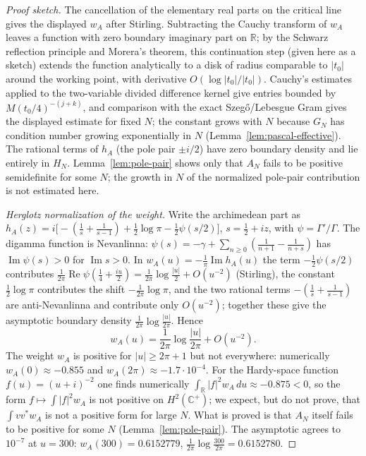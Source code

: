 \documentclass[11pt]{amsart}
\theoremstyle{definition}
\theoremstyle{remark}
\theoremstyle{definition}
\renewcommand{\Re}{\operatorname{Re}}
\renewcommand{\Im}{\operatorname{Im}}
\newcommand{\half}{\tfrac{1}{2}}
\newcommand{\R}{\mathbb{R}}
\newcommand{\C}{\mathbb{C}}
\begin{document}
\begin{proof}[Proof sketch]
The cancellation of the elementary real parts on the critical line gives the displayed $w_A$ after
Stirling.  Subtracting the Cauchy transform of $w_A$ leaves a function with zero boundary imaginary
part on $\R$; by the Schwarz reflection principle and Morera's theorem, this continuation step (given
here as a sketch) extends the function analytically to a disk of radius comparable to
$|t_0|$ around the working point, with derivative $O(\log |t_0|/|t_0|)$.  Cauchy's estimates applied
to the two-variable divided difference kernel give entries bounded by
$M(t_0/4)^{-(j+k)}$, and comparison with the exact Szeg\H{o}/Lebesgue Gram gives the displayed
estimate for fixed $N$; the constant grows with $N$ because $G_N$ has condition number growing
exponentially in $N$ (Lemma~\ref{lem:pascal-effective}).  The rational terms of $h_A$ (the pole pair
$\pm i/2$) have zero boundary density and lie entirely in $H_N$.  Lemma~\ref{lem:pole-pair} shows
only that $A_N$ fails to be positive semidefinite for some $N$; the growth in $N$ of the normalized
pole-pair contribution is not estimated here.

\emph{Herglotz normalization of the weight.}  Write the archimedean part as
$h_A(z)=i\bigl[-(\tfrac1s+\tfrac1{s-1})+\tfrac12\log\pi-\tfrac12\psi(s/2)\bigr]$, $s=\half+iz$, with
$\psi=\Gamma'/\Gamma$.  The digamma function is Nevanlinna: $\psi(s)=-\gamma+\sum_{n\ge0}
(\tfrac1{n+1}-\tfrac1{n+s})$ has $\Im\psi(s)>0$ for $\Im s>0$.  In $w_A(u)=-\tfrac1\pi\Im h_A(u)$ the
term $-\tfrac12\psi(s/2)$ contributes $\tfrac1{2\pi}\Re\psi(\tfrac14+\tfrac{iu}{2})=\tfrac1{2\pi}
\log\tfrac{|u|}{2}+O(u^{-2})$ (Stirling), the constant $\tfrac12\log\pi$ contributes the shift
$-\tfrac1{2\pi}\log\pi$, and the two rational terms $-(\tfrac1s+\tfrac1{s-1})$ are anti-Nevanlinna and
contribute only $O(u^{-2})$; together these give the asymptotic boundary density
$\tfrac1{2\pi}\log\tfrac{|u|}{2\pi}$.  Hence
\[
   w_A(u)=\frac1{2\pi}\log\frac{|u|}{2\pi}+O(u^{-2}).
\]
The weight $w_A$ is positive for $|u|\ge2\pi+1$ but not everywhere: numerically
$w_A(0)\approx-0.855$ and $w_A(2\pi)\approx-1.7\cdot10^{-4}$.  For the Hardy-space function
$f(u)=(u+i)^{-2}$ one finds numerically $\int_\R|f|^2w_A\,du\approx-0.875<0$, so the form
$f\mapsto\int|f|^2w_A$ is not positive on $H^2(\C^+)$; we expect, but do not prove, that
$\int vv^*w_A$ is not a positive form for large $N$.  What is proved is that $A_N$ itself fails to be
positive for some $N$ (Lemma~\ref{lem:pole-pair}).  The asymptotic agrees to $10^{-7}$ at $u=300$:
$w_A(300)=0.6152779$, $\tfrac1{2\pi}\log\frac{300}{2\pi}=0.6152780$.
\end{proof}
\end{document}

